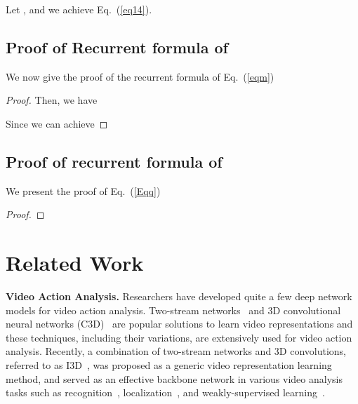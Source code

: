 \documentclass{article} \usepackage{iclr2019_conference,times}
\begin{document}
Let , and we achieve Eq.~(\ref{eq14}).


\subsection{Proof of Recurrent formula of }
We now give the proof of the recurrent formula of Eq.~(\ref{eqm}) 


\begin{proof}




Then, we have 


Since  
we can achieve


\end{proof}

\subsection{Proof of recurrent formula of }

We present the proof of Eq.~(\ref{Eqq})


\begin{proof}



\end{proof}


\section{Related Work}\label{related_work}

\textbf{Video Action Analysis.} 
Researchers have developed quite a few deep network models for video action analysis. Two-stream networks~\citep{simonyan2014two} and 3D convolutional neural networks (C3D)~\citep{tran2015learning} are popular solutions to learn video representations and these techniques, including their variations, are extensively used for video action analysis. Recently, a combination of two-stream networks and 3D convolutions, referred to as I3D~\citep{I3D}, was proposed as a generic video representation learning method, and served as an effective backbone network in various video analysis tasks such as recognition~\citep{wang2016temporal}, localization~\citep{shou2016temporal}, and weakly-supervised learning~\citep{wang2017untrimmednets}.
\end{document}
